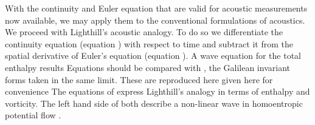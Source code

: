 With  the  continuity and Euler equation that are valid for acoustic measurements now available,
we may  apply them to the  conventional formulations of acoustics.
We proceed with Lighthill's acoustic analogy\cite{Lighthill1952, Howe1998}.
To do so we   differentiate  the continuity equation (equation ) with respect to time 
and subtract it from the spatial derivative of  Euler's equation (equation ).
A wave equation for the  total enthalpy results
Equations  should be compared with ,
the Galilean invariant forms taken in the same limit.
These are reproduced here given here for convenience
The equations of  express  Lighthill's analogy in terms of enthalpy and vorticity\cite{Howe1998}.
The left hand side of both describe a non-linear wave in homoentropic potential flow \cite{Howe1998}.

